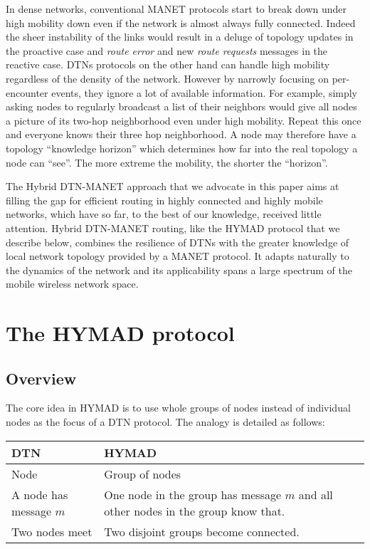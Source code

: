 \documentclass[10pt,twocolumn,letterpaper]{article}
\begin{document}
In dense networks, conventional MANET protocols start to break down
under high mobility down even if the network is almost always fully
connected. Indeed the sheer instability of the links would result in a
deluge of topology updates in the proactive case and \textit{route
  error} and new \textit{route requests} messages in the reactive
case. DTNs protocols on the other hand can handle high mobility
regardless of the density of the network. However by narrowly focusing
on per-encounter events, they ignore a lot of available
information. For example, simply asking nodes to regularly broadcast
a list of their neighbors would give all nodes a picture of its
two-hop neighborhood even under high mobility. Repeat this once and
everyone knows their three hop neighborhood. A node may therefore
have a topology ``knowledge horizon'' which determines how far into
the real topology a node can ``see''. The more extreme the mobility,
the shorter the ``horizon''.

The Hybrid DTN-MANET approach that we advocate in this paper aims at
filling the gap for efficient routing in highly connected and highly
mobile networks, which have so far, to the best of our knowledge,
received little attention.  Hybrid DTN-MANET routing, like the HYMAD
protocol that we describe below, combines the resilience of DTNs with
the greater knowledge of local network topology provided by a MANET
protocol. It adapts naturally to the dynamics of the network and its
applicability spans a large spectrum of the mobile wireless network
space.

\section{The HYMAD protocol}
\label{hymad}

\subsection{Overview}

The core idea in HYMAD is to use whole groups of nodes instead of
individual nodes as the focus of a DTN protocol. The analogy is
detailed as follows:

\renewcommand{\arraystretch}{1.2}
\begin{center}
\begin{tabular}{m{2.5cm}m{5.5cm}}
DTN & HYMAD \\
\hline
Node & Group of nodes \\
A node has message $m$ & One node in the group has message $m$ and all other nodes in the group know that. \\
Two nodes meet & Two disjoint groups become connected. \\
\hline
\end{tabular}
\end{center}
\end{document}
